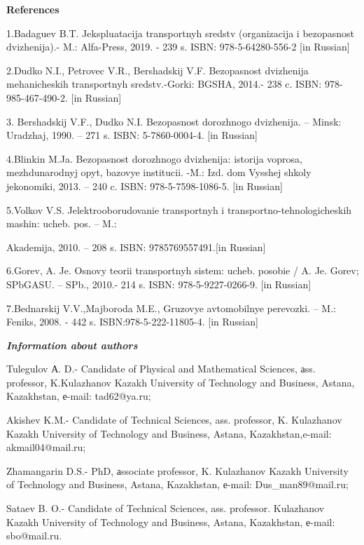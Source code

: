 \begin{center}
{\bfseries References}
\end{center}

\begin{noparindent}
1.Badaguev B.T. Jekspluatacija transportnyh sredstv (organizacija i
bezopasnost\textquotesingle{} dvizhenija).- M.:
Al\textquotesingle fa-Press, 2019. - 239 s. ISBN: 978-5-64280-556-2
{[}in Russian{]}

2.Dudko N.I., Petrovec V.R., Bershadskij V.F.
Bezopasnost\textquotesingle{} dvizhenija mehanicheskih transportnyh
sredstv.-Gorki: BGSHA, 2014.- 238 c. ISBN: 978-985-467-490-2. {[}in
Russian{]}

3. Bershadskij V.F., Dudko N.I. Bezopasnost\textquotesingle{} dorozhnogo
dvizhenija. -- Minsk: Uradzhaj, 1990. -- 271 s. ISBN: 5-7860-0004-4.
{[}in Russian{]}

4.Blinkin M.Ja. Bezopasnost\textquotesingle{} dorozhnogo dvizhenija:
istorija voprosa, mezhdunarodnyj opyt, bazovye institucii. -M.: Izd. dom
Vysshej shkoly jekonomiki, 2013. -- 240 c. ISBN: 978-5-7598-1086-5.
{[}in Russian{]}

5.Volkov V.S. Jelektrooborudovanie transportnyh i
transportno-tehnologicheskih mashin: ucheb. pos. -- M.:

Akademija, 2010.
-- 208 s. ISBN: 9785769557491.{[}in Russian{]}

6.Gorev, A. Je. Osnovy teorii transportnyh sistem: ucheb. posobie / A.
Je. Gorev; SPbGASU. -- SPb., 2010.- 214 s. ISBN: 978-5-9227-0266-9.
{[}in Russian{]}

7.Bednarskij V.V.,Majboroda M.E., Gruzovye avtomobil\textquotesingle nye
perevozki. -- M.: Feniks, 2008. - 442 s. ISBN:978-5-222-11805-4. {[}in
Russian{]}
\end{noparindent}

\emph{{\bfseries Information about authors}}

\begin{noparindent}
Tulegulov А. D.- Candidate of Physical and Mathematical Sciences, аss.
professor, K.Kulazhanov Kazakh University of Technology and Business,
Astana, Kazakhstan, е-mail: tad62@ya.ru;

Akishev K.M.- Candidate of Technical Sciences, ass. professor, K.
Kulazhanov Kazakh University of Technology and Business, Astana,
Kazakhstan,e-mail: akmail04@mail.ru;

Zhamangarin D.S.- PhD, аssociate professor, K. Kulazhanov Kazakh
University of Technology and Business, Astana, Kazakhstan, е-mail:
Dus\_man89@mail.ru;

Sataev B. O.- Candidate of Technical Sciences, ass. professor.
Kulazhanov Kazakh University of Technology and Business, Astana,
Kazakhstan, е-mail: sbo@mail.ru.
\end{noparindent}

